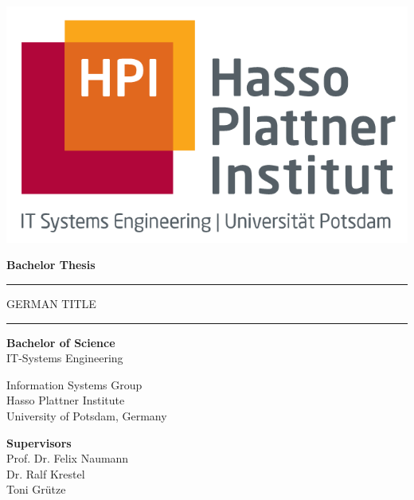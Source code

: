 \begin{titlepage}
  \begin{center}

    \includegraphics[scale=.3]{images/HPI.png}

    \vspace{1cm}

    {\Large\bfseries Bachelor Thesis \par}

    \vspace{0.5cm}

    \rule{\textwidth}{0.4pt}
    {\LARGE\bfseries \thetitle \par}
    \vspace{0.5cm}

    {\large\bfseries{GERMAN TITLE \par}}
    \rule{\textwidth}{0.4pt}


    \vspace{1.2cm}

    {\Large \theauthor \par}

    \vspace{1.2cm}

    {\large\bfseries{Bachelor of Science}}\\
    IT-Systems Engineering
    \vspace{0.3cm}

    Information Systems Group\\
    Hasso Plattner Institute\\
    University of Potsdam, Germany

    \vspace{0.8cm}

    \textbf{Supervisors}\\
    Prof. Dr. Felix Naumann\\
    Dr. Ralf Krestel\\
    Toni Grütze


    \vspace{0.8cm}

    \usvardate{}
  \end{center}
\end{titlepage}
